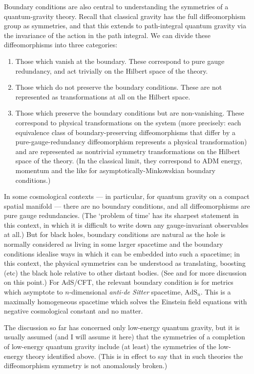 \documentclass{article}
\newcommand{\AdS}{\mathrm{AdS}}
\begin{document}
Boundary conditions are also central to understanding the symmetries of a quantum-gravity theory. Recall that classical gravity has the full diffeomorphism group as symmetries, and that this extends to path-integral quantum gravity via the invariance of the action in the path integral. We can divide these diffeomorphisms into three categories:
\begin{enumerate}
\item Those which vanish at the boundary. These correspond to pure gauge redundancy, and act trivially on the Hilbert space of the theory.
\item Those which do not preserve the boundary conditions. These are not represented as transformations at all on the Hilbert space.
\item Those which preserve the boundary conditions but are non-vanishing. These correspond to physical transformations on the system (more precisely: each equivalence class of boundary-preserving diffeomorphisms that differ by a pure-gauge-redundancy diffeomorphism represents a physical transformation) and are represented as nontrivial symmetry transformations on the Hilbert space of the theory. (In the classical limit, they correspond to ADM energy, momentum and the like for asymptotically-Minkowskian boundary conditions.)
\end{enumerate}
In some cosmological contexts --- in particular, for quantum gravity on a compact spatial manifold --- there are no boundary conditions, and all diffeomorphisms are pure gauge redundancies. (The `problem of time' has its sharpest statement in this context, in which it is difficult to write down any gauge-invariant observables at all.) But for black holes, boundary conditions are natural as the hole is normally considered as living in some larger spacetime and the boundary conditions idealise ways in which it can be embedded into such a spacetime; in this context, the physical symmetries can be understood as translating, boosting (etc) the black hole relative to other distant bodies. (See  and  for more discussion on this point.) For AdS/CFT, the relevant boundary condition is for metrics which asymptote to $n$-dimensional \emph{anti-de Sitter} spacetime, $\AdS_n$. This is a maximally homogeneous spacetime which solves the Einstein field equations with negative cosmological constant and no matter. 

The discussion so far has concerned only low-energy quantum gravity, but it is usually assumed (and I will assume it here) that the symmetries of a completion of low-energy quantum gravity include (at least) the symmetries of the low-energy theory identified above. (This is in effect to say that in such theories the diffeomorphism symmetry is not anomalously broken.)
\end{document}
